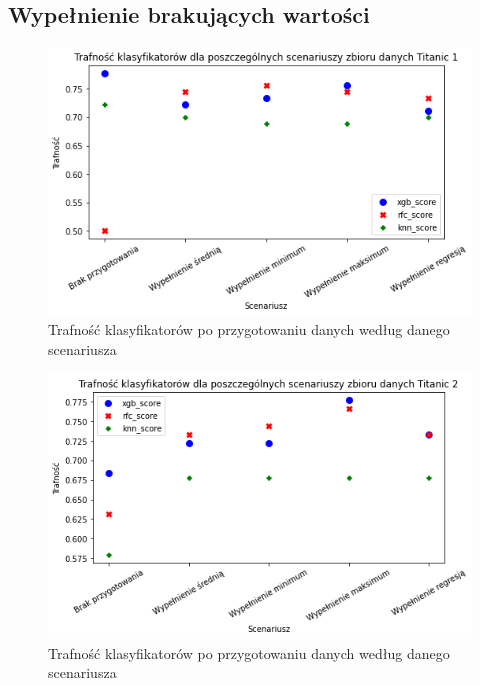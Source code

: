 \documentclass{book}
\begin{document}
\subsection{Wypełnienie brakujących wartości}
\begin{figure}[H]
\centerline{\includegraphics[scale=0.5]{Titanic_1_Wypełnienie_brakujących}}
\centering
\caption{Trafność klasyfikatorów po przygotowaniu danych 
według danego scenariusza}
\end{figure}

\begin{figure}[H]
\centerline{\includegraphics[scale=0.5]{Titanic_2_Wypełnienie_brakujących}}
\centering
\caption{Trafność klasyfikatorów po przygotowaniu danych 
według danego scenariusza}
\end{figure}
\end{document}
